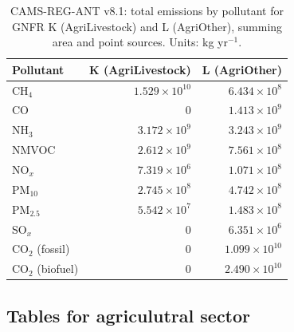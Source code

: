 \begin{table}[h]
\centering
\caption{CAMS-REG-ANT v8.1: total emissions by pollutant for GNFR K (AgriLivestock) and L (AgriOther), summing area and point sources. Units: kg yr$^{-1}$.}
\label{tab:cams_kl_totals}
\begin{tabular}{lrr}
\hline
Pollutant & K (AgriLivestock) & L (AgriOther) \\
\hline
CH$_4$ & $1.529 \times 10^{10}$ & $6.434 \times 10^{8}$ \\
CO & $0$ & $1.413 \times 10^{9}$ \\
NH$_3$ & $3.172 \times 10^{9}$ & $3.243 \times 10^{9}$ \\
NMVOC & $2.612 \times 10^{9}$ & $7.561 \times 10^{8}$ \\
NO$_x$ & $7.319 \times 10^{6}$ & $1.071 \times 10^{8}$ \\
PM$_{10}$ & $2.745 \times 10^{8}$ & $4.742 \times 10^{8}$ \\
PM$_{2.5}$ & $5.542 \times 10^{7}$ & $1.483 \times 10^{8}$ \\
SO$_x$ & $0$ & $6.351 \times 10^{6}$ \\
CO$_{2}$ (fossil) & $0$ & $1.099 \times 10^{10}$ \\
CO$_{2}$ (biofuel) & $0$ & $2.490 \times 10^{10}$ \\
\hline
\end{tabular}
\end{table}

\subsection{Tables for agriculutral sector}

